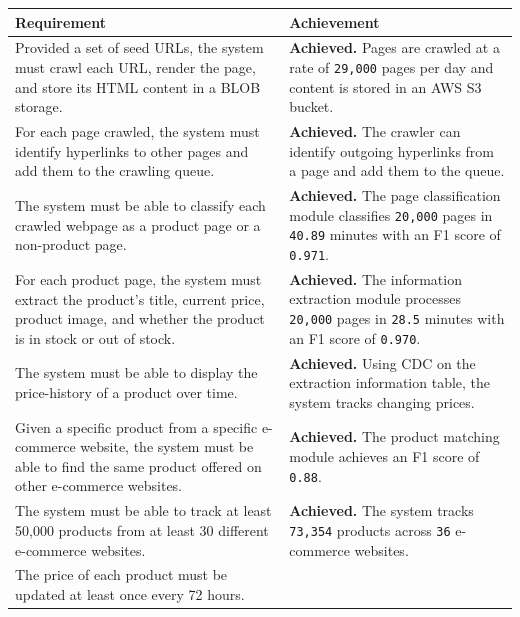 \begin{table}[H]
    \centering
    \small
    \renewcommand{\arraystretch}{1.3}
    \begin{tabularx}{\textwidth}{p{} p{}}
        \toprule
        \textbf{Requirement} & \textbf{Achievement} \\
        \midrule
        Provided a set of seed URLs, the system must crawl each URL, render the page, and store its HTML content in a BLOB storage. &
        \textbf{Achieved.} Pages are crawled at a rate of \texttt{29,000} pages per day and content is stored in an AWS S3 bucket. \\
        \midrule
        For each page crawled, the system must identify hyperlinks to other pages and add them to the crawling queue. &
        \textbf{Achieved.} The crawler can identify outgoing hyperlinks from a page and add them to the queue. \\
        \midrule
        The system must be able to classify each crawled webpage as a product page or a non-product page. &
        \textbf{Achieved.} The page classification module classifies \texttt{20,000} pages in \texttt{40.89} minutes with an F1 score of \texttt{0.971}. \\
        \midrule
        For each product page, the system must extract the product's title, current price, product image, and whether the product is in stock or out of stock. &
        \textbf{Achieved.} The information extraction module processes \texttt{20,000} pages in \texttt{28.5} minutes with an F1 score of \texttt{0.970}. \\
        \midrule
        The system must be able to display the price-history of a product over time. &
        \textbf{Achieved.} Using CDC on the extraction information table, the system tracks changing prices. \\
        \midrule
        Given a specific product from a specific e-commerce website, the system must be able to find the same product offered on other e-commerce websites. &
        \textbf{Achieved.} The product matching module achieves an F1 score of \texttt{0.88}. \\
        \midrule
        The system must be able to track at least 50,000 products from at least 30 different e-commerce websites. &
        \textbf{Achieved.} The system tracks \texttt{73,354} products across \texttt{36} e-commerce websites. \\
        \midrule
        The price of each product must be updated at least once every 72 hours. &

\end{tabularx}
\end{table}

